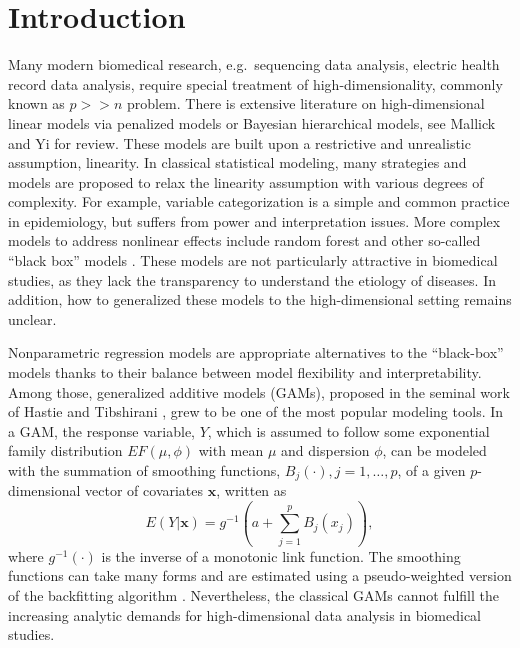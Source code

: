 \documentclass[AMA,STIX1COL,]{WileyNJD-v2}
\begin{document}
\pgfplotsset{compat=1.18}
\usetikzlibrary{shapes.geometric, arrows, positioning, calc, matrix, backgrounds, fit}
\newcommand{\bs}[1]{\boldsymbol{#1}}
\newcommand{\tp}{*}
\newcommand{\pr}{\text{Pr}}
\newcommand{\repa}{\text{repa}}
\newcommand{\simiid}{\overset{\text{iid}}{\sim}}

\hypertarget{introduction}{%
\section{Introduction}\label{introduction}}

\label{sec:intro}

Many modern biomedical research, e.g.~sequencing data analysis, electric
health record data analysis, require special treatment of
high-dimensionality, commonly known as \(p >> n\) problem. There is
extensive literature on high-dimensional linear models via penalized
models or Bayesian hierarchical models, see Mallick and Yi
\citep{Mallick2013} for review. These models are built upon a
restrictive and unrealistic assumption, linearity. In classical
statistical modeling, many strategies and models are proposed to relax
the linearity assumption with various degrees of complexity. For
example, variable categorization is a simple and common practice in
epidemiology, but suffers from power and interpretation issues. More
complex models to address nonlinear effects include random forest and
other so-called ``black box'' models \citep{Breiman2001}. These models
are not particularly attractive in biomedical studies, as they lack the
transparency to understand the etiology of diseases. In addition, how to
generalized these models to the high-dimensional setting remains
unclear.

Nonparametric regression models are appropriate alternatives to the
``black-box'' models thanks to their balance between model flexibility
and interpretability. Among those, generalized additive models (GAMs),
proposed in the seminal work of Hastie and Tibshirani
\citep{Hastie1987}, grew to be one of the most popular modeling tools.
In a GAM, the response variable, \(Y\), which is assumed to follow some
exponential family distribution \(EF(\mu, \phi)\) with mean \(\mu\) and
dispersion \(\phi\), can be modeled with the summation of smoothing
functions, \(B_j(\cdot), j = 1, \dots, p\), of a given \(p\)-dimensional
vector of covariates \(\boldsymbol{x}\), written as \[
 E(Y|\boldsymbol{x}) = g^{-1}(a + \sum\limits^p_{j=1}B_j(x_j)),
\] where \(g^{-1}(\cdot)\) is the inverse of a monotonic link function.
The smoothing functions can take many forms and are estimated using a
pseudo-weighted version of the backfitting algorithm
\citep{Breiman1985}. Nevertheless, the classical GAMs cannot fulfill the
increasing analytic demands for high-dimensional data analysis in
biomedical studies.
\end{document}
